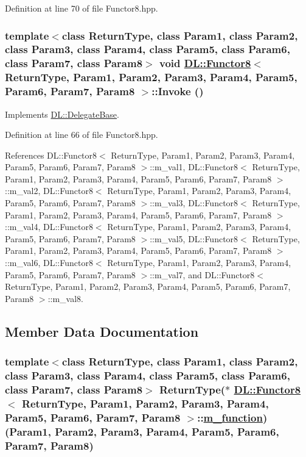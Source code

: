 Definition at line 70 of file Functor8.hpp.\hypertarget{classDL_1_1Functor8_a2}{
\subsubsection[Invoke]{\setlength{\rightskip}{0pt plus 5cm}template$<$class Return\-Type, class Param1, class Param2, class Param3, class Param4, class Param5, class Param6, class Param7, class Param8$>$ void \hyperlink{classDL_1_1Functor8}{DL::Functor8}$<$ Return\-Type, Param1, Param2, Param3, Param4, Param5, Param6, Param7, Param8 $>$::Invoke ()}}
\label{classDL_1_1Functor8_a2}




Implements \hyperlink{classDL_1_1DelegateBase_a2}{DL::Delegate\-Base}.

Definition at line 66 of file Functor8.hpp.

References DL::Functor8$<$ Return\-Type, Param1, Param2, Param3, Param4, Param5, Param6, Param7, Param8 $>$::m\_\-val1, DL::Functor8$<$ Return\-Type, Param1, Param2, Param3, Param4, Param5, Param6, Param7, Param8 $>$::m\_\-val2, DL::Functor8$<$ Return\-Type, Param1, Param2, Param3, Param4, Param5, Param6, Param7, Param8 $>$::m\_\-val3, DL::Functor8$<$ Return\-Type, Param1, Param2, Param3, Param4, Param5, Param6, Param7, Param8 $>$::m\_\-val4, DL::Functor8$<$ Return\-Type, Param1, Param2, Param3, Param4, Param5, Param6, Param7, Param8 $>$::m\_\-val5, DL::Functor8$<$ Return\-Type, Param1, Param2, Param3, Param4, Param5, Param6, Param7, Param8 $>$::m\_\-val6, DL::Functor8$<$ Return\-Type, Param1, Param2, Param3, Param4, Param5, Param6, Param7, Param8 $>$::m\_\-val7, and DL::Functor8$<$ Return\-Type, Param1, Param2, Param3, Param4, Param5, Param6, Param7, Param8 $>$::m\_\-val8.

\subsection{Member Data Documentation}
\hypertarget{classDL_1_1Functor8_r0}{
\subsubsection[m\_\-function]{\setlength{\rightskip}{0pt plus 5cm}template$<$class Return\-Type, class Param1, class Param2, class Param3, class Param4, class Param5, class Param6, class Param7, class Param8$>$ Return\-Type($\ast$ \hyperlink{classDL_1_1Functor8}{DL::Functor8}$<$ Return\-Type, Param1, Param2, Param3, Param4, Param5, Param6, Param7, Param8 $>$::\hyperlink{classDL_1_1Functor8_r0}{m\_\-function})(Param1, Param2, Param3, Param4, Param5, Param6, Param7, Param8)}}
\label{classDL_1_1Functor8_r0}




